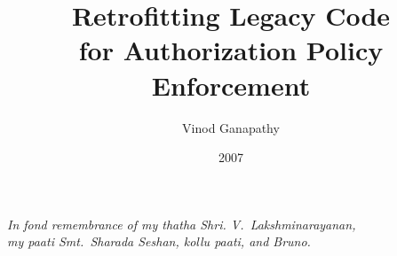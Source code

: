 \documentclass[12pt]{withesis}
\begin{document}
\clearpage{} 
\title{Retrofitting Legacy Code\\ for Authorization Policy Enforcement}
\author{Vinod Ganapathy}
\date{2007}
\maketitle
\copyrightpage

\begin{dedication}
\textit{In fond remembrance of my thatha Shri. V.~Lakshminarayanan,\\
my paati Smt.~Sharada Seshan, kollu paati, and Bruno.}
\end{dedication}



\tableofcontents
\listoftables
\listoffigures


\begin{umiabstract}
  
\end{umiabstract}

\begin{abstract}
  
\end{abstract}

\clearpage{}













% 
\end{document}
